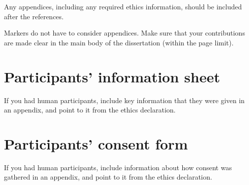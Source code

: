 \documentclass[logo,msc,cyber]{infthesis}   %
\begin{document}
Any appendices, including any required ethics information, should be included
after the references.

Markers do not have to consider appendices. Make sure that your contributions
are made clear in the main body of the dissertation (within the page limit).

\chapter{Participants' information sheet}

If you had human participants, include key information that they were given in
an appendix, and point to it from the ethics declaration.

\chapter{Participants' consent form}

If you had human participants, include information about how consent was
gathered in an appendix, and point to it from the ethics declaration.
\end{document}
